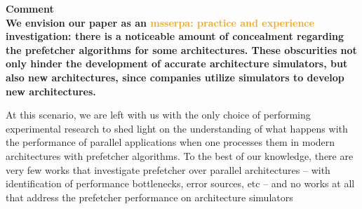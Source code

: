 \documentclass{article}
\newcounter{answer}
\newenvironment{answer}
{ \refstepcounter{answer}\vspace{0.5cm}\bfseries\noindent Comment~\theanswer\\ }
{ \vspace{0.5cm} }
\newcommand{\ms}[1]{\textcolor{orange}{\textbf{ msserpa: #1} }\vspace{0.2cm}}
\newcommand{\vsg}[1]{\textcolor{blue}{\textbf{vsgirelli: #1} }\vspace{0.2cm}}
\begin{document}
\begin{answer}
We envision our paper as an \ms{practice and experience} investigation: there is a noticeable amount of concealment regarding the prefetcher algorithms for some architectures. These obscurities not only hinder the development of accurate architecture simulators, but also new architectures, since companies utilize simulators to develop new architectures.

At this scenario, we are left with us with the only choice of performing experimental research to shed light on the understanding of what happens with the performance of parallel applications when one processes them in modern architectures with prefetcher algorithms. To the best of our knowledge, there are very few works that investigate prefetcher over parallel architectures -- with identification of performance bottlenecks, error sources, etc -- and no works at all that address the prefetcher performance on architecture simulators


\end{answer}
\end{document}
